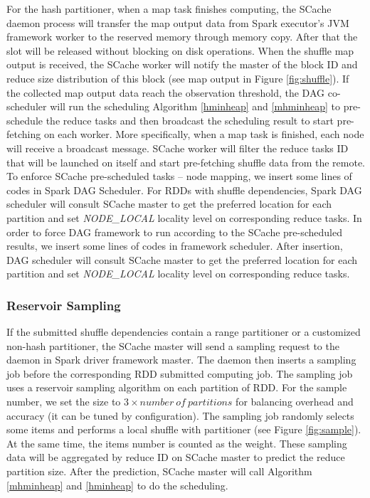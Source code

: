 For the hash partitioner, when a map task finishes computing, the SCache daemon process will transfer the map output data from {\color{red}Spark executor's JVM }{\color{blue}framework worker} to the reserved memory through memory copy.
After that the slot will be released without blocking on disk operations.
When the shuffle map output is received, the SCache worker will notify the master of the block ID and reduce size distribution of this block (see map output in Figure \ref{fig:shuffle}).
If the collected map output data reach the observation threshold, the DAG co-scheduler will run the scheduling Algorithm \ref{hminheap} and \ref{mhminheap} to pre-schedule the reduce tasks and then broadcast the scheduling result to start pre-fetching on each worker.
More specifically, when a map task is finished, each node will receive a broadcast message. SCache worker will filter the reduce tasks ID that will be launched on itself and start pre-fetching shuffle data from the remote. 
{\color{red}
To enforce SCache pre-scheduled tasks -- node mapping, we insert some lines of codes in Spark DAG Scheduler.
For RDDs with shuffle dependencies, Spark DAG scheduler will consult SCache master to get the preferred location for each partition and set \textit{NODE\_LOCAL} locality level on corresponding reduce tasks.
}
{\color{blue}
In order to force DAG framework to run according to the SCache pre-scheduled results, we insert some lines of codes in framework scheduler.
After insertion, DAG scheduler will consult SCache master to get the preferred location for each partition and set \textit{NODE\_LOCAL} locality level on corresponding reduce tasks.
}

\subsubsection{Reservoir Sampling}\label{sampling}
If the submitted shuffle dependencies contain a range partitioner or a customized non-hash partitioner, the SCache master will send a sampling request to the {\color{red}daemon in Spark driver} {\color{blue}framework master}. 
The daemon then inserts a sampling job before the {\color{red}corresponding RDD} {\color{blue} submitted computing job}. 
The sampling job uses a reservoir sampling algorithm \cite{reservoir} on each partition {\color{red}of RDD}. 
For the sample number, we set the size to $3 \times number\ of\ partitions$ for balancing overhead and accuracy (it can be tuned by configuration). The sampling job randomly selects some items and performs a local shuffle with partitioner (see Figure \ref{fig:sample}). At the same time, the items number is counted as the weight. These sampling data will be aggregated by reduce ID on SCache master to predict the reduce partition size. After the prediction, SCache master will call Algorithm \ref{mhminheap} and \ref{hminheap} to do the scheduling.

